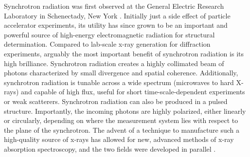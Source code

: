 

Synchrotron radiation was first observed at the General Electric Research Laboratory in Schenectady, New York \cite{firstSynchrotronRadPaper}. Initially just a side effect of particle accelerator experiments, its utility has since grown to be an important and powerful source of high-energy electromagnetic radiation for structural determination. Compared to lab-scale x-ray generation for diffraction experiments, arguably the most important benefit of synchrotron radiation is its high brilliance. Synchrotron radiation creates a highly collimated beam of photons characterized by small divergence and spatial coherence. Additionally, synchrotron radiation is tunable across a wide spectrum (microwaves to hard X-rays) and capable of high flux, useful for short time-scale-dependent experiments or weak scatterers. Synchrotron radiation can also be produced in a pulsed structure. Importantly, the incoming photons are highly polarized, either linearly or circularly, depending on where the measurement system lies with respect to the plane of the synchrotron. The advent of a technique to manufacture such a high-quality source of x-rays has allowed for new, advanced methods of x-ray absorption spectroscopy, and the two fields were developed in parallel \cite{synchrotronbook}. 

